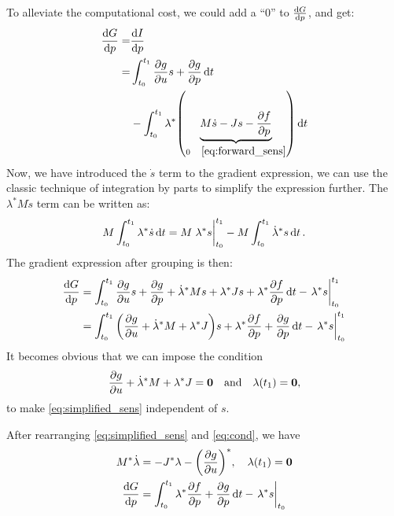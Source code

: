 \documentclass[a4paper,9pt,twocolumn]{article}
\theoremstyle{definition}
\theoremstyle{remark}
\begin{document}
To alleviate the computational cost, we could add a ``$0$'' to $\dv{G}{p}$, and
get:
\begin{align}
  \dv{G}{p} = &\dv{I}{p} \\
  = &\int_{t_0}^{t_1} \pdv{g}{u}s + \pdv{g}{p} \dd{t} \\
  &-\int_{t_0}^{t_1} \lambda^*\qty(\underbrace{M\dot{s} -
  Js - \pdv{f}{p}}_{0 \quad\cref{eq:forward_sens}}) \dd{t}
\end{align}
Now, we have introduced the $\dot{s}$ term to the gradient expression, we can
use the classic technique of integration by parts to simplify the expression
further. The $\lambda^* M\dot{s}$ term can be written as:
\begin{align}
  M\int_{t_0}^{t_1} \lambda^* \dot{s} \dd{t} = M\eval{\lambda^* s}_{t_0}^{t_1} -
  M\int_{t_0}^{t_1} \dot{\lambda}^* s \dd{t}.
\end{align}
The gradient expression after grouping is then:
\begin{align} \label{eq:simplified_sens}
  \dv{G}{p} &= \int_{t_0}^{t_1} \pdv{g}{u}s + \pdv{g}{p}
  + \dot{\lambda}^* Ms + \lambda^* Js+ \lambda^* \pdv{f}{p} \dd{t}
              - \eval{\lambda^* s}_{t_0}^{t_1} \nonumber \\
            &= \int_{t_0}^{t_1} \qty(\pdv{g}{u} + \dot{\lambda}^*M  + \lambda^* J)s
              +\lambda^* \pdv{f}{p}  + \pdv{g}{p} \dd{t}
              - \eval{\lambda^* s}_{t_0}^{t_1}
\end{align}
It becomes obvious that we can impose the condition
\begin{equation} \label{eq:cond}
  \pdv{g}{u} + \dot{\lambda}^*M + \lambda^* J = \bm{0} \qq{and}
  \lambda(t_1) = \bm{0},
\end{equation}
to make \cref{eq:simplified_sens} independent of $s$.

After rearranging \cref{eq:simplified_sens} and \cref{eq:cond}, we have
\begin{align}
  M^*\dot{\lambda} &= -J^* \lambda - \qty(\pdv{g}{u})^*, \quad \lambda(t_1) = \bm{0} \\
  \dv{G}{p} &= \int_{t_0}^{t_1} \lambda^* \pdv{f}{p}  + \pdv{g}{p} \dd{t}
              - \eval{\lambda^* s}_{t_0}
\end{align}
\end{document}
